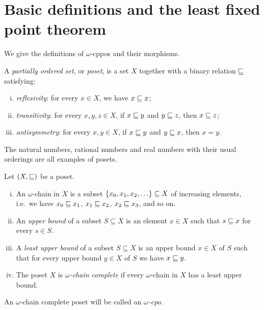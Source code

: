 \section{Basic definitions and the least fixed point theorem}

We give the definitions of \(\omega\)-cppos and their morphisms.

\begin{definition}[Poset]
  A \emph{partially ordered set}, or \emph{poset}, is a set \(X\) together with
  a binary relation \({\sqsubseteq}\) satisfying:
  \begin{enumerate}[(i)]
  \item \emph{reflexivity}: for every \(x \in X\), we have \(x \sqsubseteq x\);
  \item \emph{transitivity}: for every \(x,y,z \in X\), if \(x \sqsubseteq y\) and
    \(y \sqsubseteq z\), then \(x \sqsubseteq z\);
  \item \emph{antisymmetry}: for every \(x,y \in X\), if \(x \sqsubseteq y\) and
    \(y \sqsubseteq x\), then \(x = y\).
  \end{enumerate}
\end{definition}

\begin{example}
  The natural numbers, rational numbers and real numbers with their usual
  orderings are all examples of posets.
\end{example}

\begin{definition}
  Let \((X,{\sqsubseteq})\) be a poset.
  \begin{enumerate}[(i)]
  \item An \(\omega\)-chain in \(X\) is a subset
    \(\set{x_0,x_1,x_2,\dots} \subseteq X\) of increasing elements, i.e.\ we
    have \(x_0 \sqsubseteq x_1\), \(x_1 \sqsubseteq x_2\), \(x_2 \sqsubseteq x_3\), and so
    on.%
  \item An \emph{upper bound} of a subset \(S \subseteq X\) is an element
    \(x \in X\) such that \(s \sqsubseteq x\) for every \(s \in S\).
  \item A \emph{least upper bound} of a subset \(S \subseteq X\) is an upper
    bound \(x \in X\) of \(S\) such that for every upper bound \(y \in X\) of
    \(S\) we have \(x \sqsubseteq y\).
  \item The poset \(X\) is \emph{\(\omega\)-chain complete} if every
    \(\omega\)-chain in \(X\) has a least upper bound.%
  \end{enumerate}
  An \(\omega\)-chain complete poset will be called an \emph{\(\omega\)-cpo}.
\end{definition}

